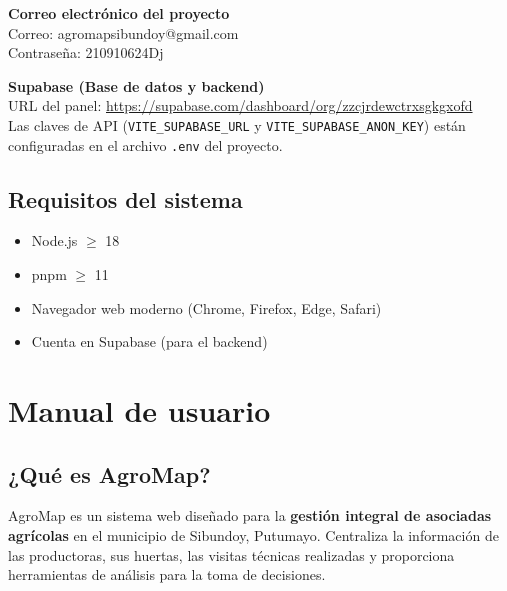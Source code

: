 \documentclass[12pt]{article}
\begin{document}
\begin{credbox}
  \textbf{Correo electr\'onico del proyecto}\\[0.3em]
  Correo: agromapsibundoy@gmail.com\\[0.3em]
  Contrase\~na: 210910624Dj
\end{credbox}

\begin{credbox}
  \textbf{Supabase (Base de datos y backend)}\\[0.3em]
  URL del panel: \url{https://supabase.com/dashboard/org/zzcjrdewctrxsgkgxofd}\\[0.3em]
  Las claves de API (\texttt{VITE\_SUPABASE\_URL} y \texttt{VITE\_SUPABASE\_ANON\_KEY}) est\'an configuradas en el archivo \texttt{.env} del proyecto.
\end{credbox}

\subsection{Requisitos del sistema}
\begin{itemize}[nosep]
  \item Node.js $\ge$ 18
  \item pnpm $\ge$ 11
  \item Navegador web moderno (Chrome, Firefox, Edge, Safari)
  \item Cuenta en Supabase (para el backend)
\end{itemize}

\section{Manual de usuario}

\subsection{¿Qué es AgroMap?}
AgroMap es un sistema web dise\~nado para la \textbf{gesti\'on integral de asociadas agr\'icolas} en el municipio de Sibundoy, Putumayo. Centraliza la informaci\'on de las productoras, sus huertas, las visitas t\'ecnicas realizadas y proporciona herramientas de an\'alisis para la toma de decisiones.
\end{document}
